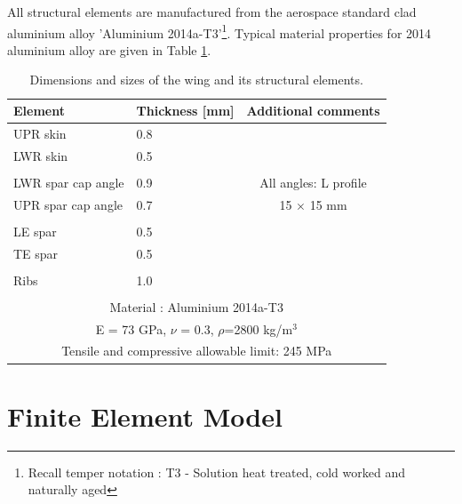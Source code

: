 \documentclass[11pt,a4paper,oneside]{memoir}
\begin{document}
All structural elements are manufactured from the aerospace standard clad aluminium alloy 'Aluminium 2014a-T3'\footnote{Recall temper notation : T3 - Solution heat treated, cold worked and naturally aged}. Typical material properties for 2014 aluminium alloy are given in Table \ref{tab:wing-size}.  
%
\begin{table}[!h]
\centering
\caption{Dimensions and sizes of the wing and its structural elements.}
\label{tab:wing-size}
\begin{tabular}{llc}
\toprule
Element              & Thickness [mm]  &   Additional comments  \\    
\midrule
UPR skin             & 0.8         &  \\
LWR skin             & 0.5         &  \\
                     &             &  \\
LWR spar cap angle   & 0.9         &  All angles: L profile  \\
UPR spar cap angle   & 0.7         &  15 $\times$ 15 mm\\
                     &             &  \\
LE spar              & 0.5         &  \\
TE spar              & 0.5         &  \\
                     &             &  \\
Ribs                 & 1.0         &  \\
                     &             &  \\
\midrule
\multicolumn{3}{c}{Material : Aluminium 2014a-T3}\\
\multicolumn{3}{c}{E = 73 GPa, $\nu$ = 0.3, $\rho$=2800 kg/m$^{3}$}\\
\multicolumn{3}{c}{Tensile and compressive allowable limit: 245 MPa}\\
\bottomrule
\end{tabular}
\end{table}

%
\chapter{Finite Element Model}\label{chap:fe-model}
\end{document}
